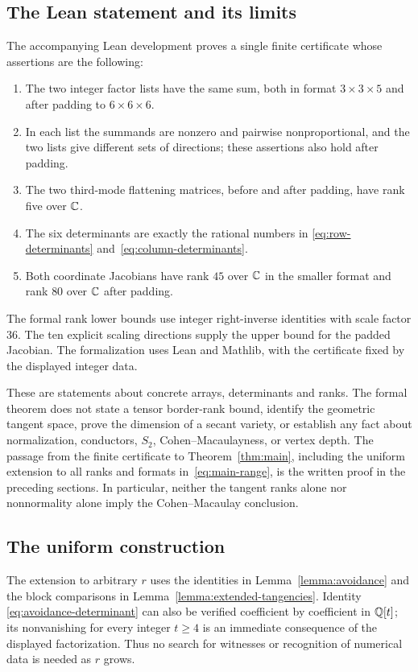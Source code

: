 \subsection{The Lean statement and its limits}

The accompanying Lean development proves a single finite certificate
whose assertions are the following:
\begin{enumerate}
 \item The two integer factor lists have the same sum, both in format
 $3\times3\times5$ and after padding to $6\times6\times6$.
 \item In each list the summands are nonzero and pairwise
 nonproportional, and the two lists give different sets of directions;
 these assertions also hold after padding.
 \item The two third-mode flattening matrices, before and after
 padding, have rank five over $\mathbb C$.
 \item The six determinants are exactly the rational numbers in
 \eqref{eq:row-determinants} and~\eqref{eq:column-determinants}.
 \item Both coordinate Jacobians have rank $45$ over $\mathbb C$ in the
 smaller format and rank $80$ over $\mathbb C$ after padding.
\end{enumerate}
The formal rank lower bounds use integer right-inverse identities
with scale factor $36$. The ten explicit scaling directions supply
the upper bound for the padded Jacobian. The formalization uses Lean
and Mathlib, with the certificate fixed by the displayed integer data.

These are statements about concrete arrays, determinants and ranks.
The formal theorem does not state a tensor border-rank bound, identify
the geometric tangent space, prove the dimension of a secant variety,
or establish any fact about normalization, conductors, $S_2$,
Cohen--Macaulayness, or vertex depth. The passage from the finite
certificate to Theorem~\ref{thm:main}, including the uniform extension
to all ranks and formats in~\eqref{eq:main-range}, is the written
proof in the preceding sections. In particular,
neither the tangent ranks alone nor nonnormality alone imply the
Cohen--Macaulay conclusion.


\subsection{The uniform construction}

The extension to arbitrary $r$ uses the identities in
Lemma~\ref{lemma:avoidance} and the block comparisons in
Lemma~\ref{lemma:extended-tangencies}. Identity
\eqref{eq:avoidance-determinant} can also be verified coefficient by
coefficient in $\mathbb Q[t]$; its nonvanishing for every integer $t\geq4$
is an immediate consequence of the displayed factorization.
Thus no search for witnesses or recognition of numerical data is
needed as $r$ grows.

